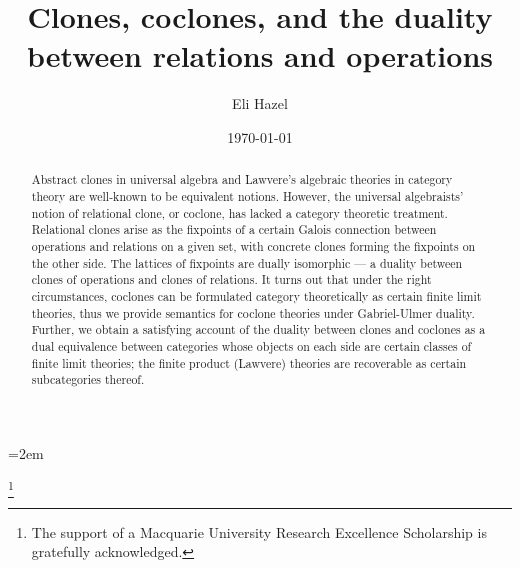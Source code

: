 \documentclass[11pt, a4paper, twoside,leqno]{amsart}
\numberwithin{equation}{section}
\theoremstyle{plain}
\theoremstyle{definition}
\begin{document}
\leftmargini=2em 
\title{Clones, coclones, and the duality between relations and operations}
\author{Eli Hazel} 
\address{School of Mathematical and Physical Sciences, Macquarie University, NSW 2109, Australia} 

\date{\today}

\thanks{The support of a Macquarie University Research Excellence
  Scholarship is gratefully acknowledged.}

\begin{abstract}
  Abstract clones in universal algebra and Lawvere's algebraic
  theories in category theory are well-known to be equivalent notions.
  However, the universal algebraists' notion of relational clone, or coclone, has lacked a category
  theoretic treatment. Relational clones arise as the fixpoints of a certain
  Galois connection between operations and relations on a given set,
  with concrete clones forming the fixpoints on the other side. The lattices of
  fixpoints are dually isomorphic --- a duality between
  clones of operations and clones of relations.
It turns out that under the right circumstances, coclones can be formulated category theoretically as
certain finite limit theories, thus we provide semantics for coclone theories under
Gabriel-Ulmer duality. Further, we obtain a satisfying account
of the duality between clones and coclones as a dual equivalence
  between categories whose objects on each side are certain classes of
  finite limit theories; the finite product (Lawvere) theories are
  recoverable as certain subcategories thereof.
\end{abstract}
\maketitle
\end{document}
